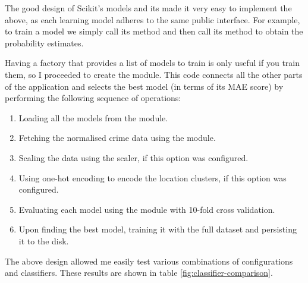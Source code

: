 \documentclass{article}
\begin{document}
	The good design of Scikit's models and its made it very easy to implement the above, as each learning model adheres to the same public interface. For example, to train a model we simply call its  method and then call its  method to obtain the probability estimates.

	Having a factory that provides a list of models to train is only useful if you train them, so I proceeded to create the  module. This code connects all the other parts of the application and selects the best model (in terms of its MAE score) by performing the following sequence of operations:

	\begin{enumerate}
		\item Loading all the models from the  module.
		\item Fetching the normalised crime data using the  module.
		\item Scaling the data using the  scaler, if this option was configured.
		\item Using one-hot encoding to encode the location clusters, if this option was configured.
		\item Evaluating each model using the  module with 10-fold cross validation.
		\item Upon finding the best model, training it with the full dataset and persisting it to the disk.
	\end{enumerate}

	The above design allowed me easily test various combinations of configurations and classifiers. These results are shown in table \ref{fig:classifier-comparison}.
\end{document}
